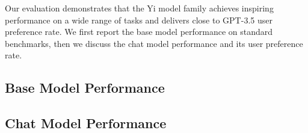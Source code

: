 
Our evaluation demonstrates that the Yi model family achieves inspiring performance on a wide range of tasks and delivers close to GPT-3.5 user preference rate. We first report the base model performance on standard benchmarks, then we discuss the chat model performance and its user preference rate. 





% 

\subsection{Base Model Performance}


\subsection{Chat Model Performance}


% 

% 